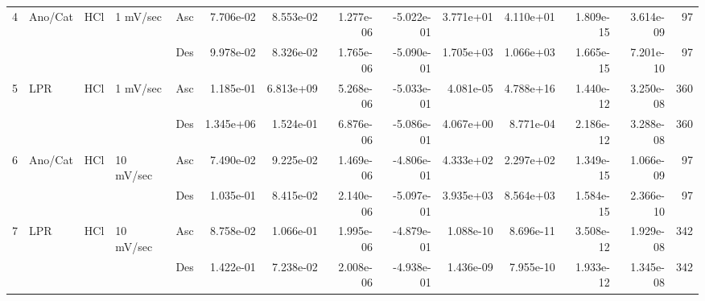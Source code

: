 \begin{tabular}{lllllrrrrrrrrr}
4 & Ano/Cat & HCl & 1 mV/sec & Asc &  7.706e-02 &     8.553e-02 &              1.277e-06 &                -5.022e-01 &        3.771e+01 &           4.110e+01 &        1.809e-15 &                       3.614e-09 &   97 \\
  &     &     &           & Des &  9.978e-02 &     8.326e-02 &              1.765e-06 &                -5.090e-01 &        1.705e+03 &           1.066e+03 &        1.665e-15 &                       7.201e-10 &   97 \\
5 & LPR & HCl & 1 mV/sec & Asc &  1.185e-01 &     6.813e+09 &              5.268e-06 &                -5.033e-01 &        4.081e-05 &           4.788e+16 &        1.440e-12 &                       3.250e-08 &  360 \\
  &     &     &           & Des &  1.345e+06 &     1.524e-01 &              6.876e-06 &                -5.086e-01 &        4.067e+00 &           8.771e-04 &        2.186e-12 &                       3.288e-08 &  360 \\
6 & Ano/Cat & HCl & 10 mV/sec & Asc &  7.490e-02 &     9.225e-02 &              1.469e-06 &                -4.806e-01 &        4.333e+02 &           2.297e+02 &        1.349e-15 &                       1.066e-09 &   97 \\
  &     &     &           & Des &  1.035e-01 &     8.415e-02 &              2.140e-06 &                -5.097e-01 &        3.935e+03 &           8.564e+03 &        1.584e-15 &                       2.366e-10 &   97 \\
7 & LPR & HCl & 10 mV/sec & Asc &  8.758e-02 &     1.066e-01 &              1.995e-06 &                -4.879e-01 &        1.088e-10 &           8.696e-11 &        3.508e-12 &                       1.929e-08 &  342 \\
  &     &     &           & Des &  1.422e-01 &     7.238e-02 &              2.008e-06 &                -4.938e-01 &        1.436e-09 &           7.955e-10 &        1.933e-12 &                       1.345e-08 &  342 \\
\bottomrule
\end{tabular}
